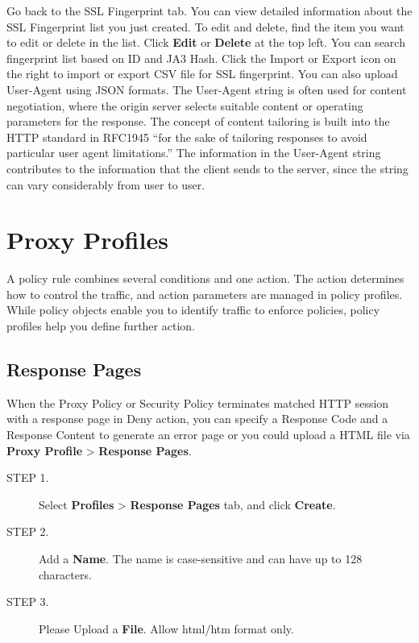 Go back to the SSL Fingerprint tab. You can view detailed information about the SSL Fingerprint list you just created. 
To edit and delete, find the item you want to edit or delete in the list. Click \textbf{Edit} or \textbf{Delete} at the top left. 
You can search fingerprint list based on ID and JA3 Hash. Click the Import or Export icon on the right to import or export CSV file for SSL fingerprint. 
You can also upload User-Agent using JSON formats. The User-Agent string is often used for content negotiation, 
where the origin server selects suitable content or operating parameters for the response. 
The concept of content tailoring is built into the HTTP standard in RFC1945 “for the sake of tailoring responses to avoid particular user agent limitations.” 
The information in the User-Agent string contributes to the information that the client sends to the server, since the string can vary considerably from user to user.

\section*{\hypertarget{link:Proxy Profiles}{Proxy Profiles}}
\label{sec:decrypt:profile}

A policy rule combines several conditions and one action. The action determines how to control the traffic, and action parameters are managed in policy profiles. 
While policy objects enable you to identify traffic to enforce policies, policy profiles help you define further action.

\subsection*{\hypertarget{link:Response Pages}{Response Pages}}
\label{sec:decrypt:profile:response}

When the Proxy Policy or Security Policy terminates matched HTTP session with a response page in Deny action, 
you can specify a Response Code and a Response Content to generate an error page 
or you could upload a HTML file via \textbf{Proxy Profile} > \textbf{Response Pages}.

\begin{description}
    \item[STEP 1.]	Select \textbf{Profiles} > \textbf{Response Pages} tab, and click \textbf{Create}.
    \item[STEP 2.]	Add a \textbf{Name}. The name is case-sensitive and can have up to 128 characters.
    \item[STEP 3.]	Please Upload a \textbf{File}. Allow html/htm format only. 
\end{description} 


